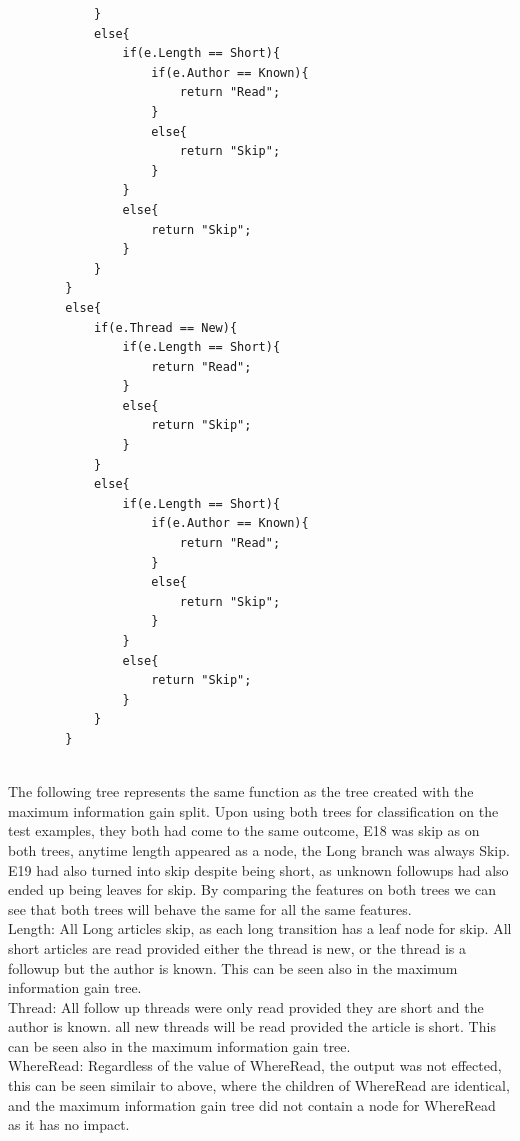 \documentclass{article}
\newcommand*\fixindent{ \hspace{1pt}\\}
\begin{document}
\begin{enumerate}[(a)]
\begin{lstlisting}
            }
            else{
                if(e.Length == Short){
                    if(e.Author == Known){
                        return "Read";
                    }
                    else{
                        return "Skip";
                    }
                }
                else{
                    return "Skip";
                }
            }
        }
        else{
            if(e.Thread == New){
                if(e.Length == Short){
                    return "Read";
                }
                else{
                    return "Skip";
                }
            }
            else{
                if(e.Length == Short){
                    if(e.Author == Known){
                        return "Read";
                    }
                    else{
                        return "Skip";
                    }
                }
                else{
                    return "Skip";
                }
            }
        }
    \end{lstlisting}\fixindent{}
The following tree represents the same function as the tree created with the maximum information gain split. Upon using both trees for classification on the test examples, they both had come to the same outcome, E18 was skip as on both trees, anytime length appeared as a node, the Long branch was always Skip. E19 had also turned into skip despite being short, as unknown  followups had also ended up being leaves for skip. By comparing the features on both trees we can see that both trees will behave the same for all the same features.\\

Length: All Long articles skip, as each long transition has a leaf node for skip. All short articles are read provided either the thread is new, or the thread is a followup but the author is known. This can be seen also in the maximum information gain tree.\\

Thread: All follow up threads were only read provided they are short and the author is known. all new threads will be read provided the article is short. This can be seen also in the maximum information gain tree.\\

WhereRead: Regardless of the value of WhereRead, the output was not effected, this can be seen similair to above, where the children of WhereRead are identical, and the maximum information gain tree did not contain a node for WhereRead as it has no impact.\\


\end{enumerate}
\end{document}
